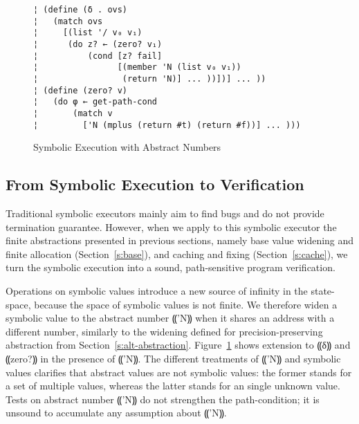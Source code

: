 \begin{figure} %
\begin{lstlisting}
¦ (define (δ . ovs)
¦   (match ovs
¦     [(list '/ v₀ v₁)
¦      (do z? ← (zero? v₁)
¦          (cond [z? fail]
¦                [(member 'N (list v₀ v₁))
¦                 (return 'N)] ... ))])] ... ))
¦ (define (zero? v)
¦   (do φ ← get-path-cond
¦       (match v 
¦         ['N (mplus (return #t) (return #f))] ... )))
\end{lstlisting}
\caption{Symbolic Execution with Abstract Numbers}
\label{f:symbolic-widen}
\end{figure} %

\subsection{From Symbolic Execution to Verification}

Traditional symbolic executors mainly aim to find bugs and do not provide
termination guarantee. However, when we apply to this symbolic executor the
finite abstractions presented in previous sections, namely base value widening
and finite allocation (Section~\ref{s:base}), and caching and fixing
(Section~\ref{s:cache}), we turn the symbolic execution into a sound,
path-sensitive program verification.

Operations on symbolic values introduce a new source of infinity in the
state-space, because the space of symbolic values is not finite. We therefore
widen a symbolic value to the abstract number ⸨'N⸩ when it shares an address
with a different number, similarly to the widening defined for
precision-preserving abstraction from Section~\ref{s:alt-abstraction}.
Figure~\ref{f:symbolic-widen} shows extension to ⸨δ⸩ and ⸨zero?⸩ in the
presence of ⸨'N⸩. The different treatments of ⸨'N⸩ and symbolic values
clarifies that abstract values are not symbolic values: the former stands for a
set of multiple values, whereas the latter stands for an single unknown value.
Tests on abstract number ⸨'N⸩ do not strengthen the path-condition; it is
unsound to accumulate any assumption about ⸨'N⸩.

